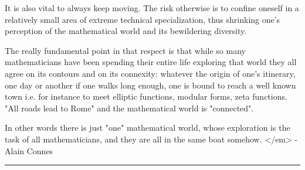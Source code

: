 It is also vital to always keep moving. The risk otherwise is to confine 
 oneself in a relatively small area of extreme technical specialization, thus 
 shrinking one's perception of the mathematical world and its bewildering 
 diversity.

 The really fundamental point in that respect is that while so many
 mathematicians have been spending their entire life exploring that
 world they all agree on its contours and on its connexity: whatever
 the origin of one's itinerary, one day or another if one walks long
 enough, one is bound to reach a well known town i.e. for instance to
 meet elliptic functions, modular forms, zeta functions. "All
 roads lead to Rome" and the mathematical world is
 "connected".

 In other words there is just "one" mathematical world, whose exploration is 
 the task of all mathematicians, and they are all in the same boat somehow. 
</em>  - Alain Connes


\par\noindent\rule{\textwidth}{0.4pt}

